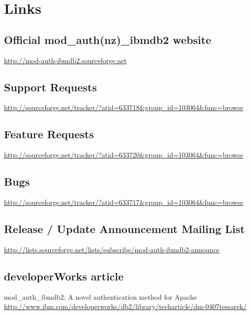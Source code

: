 \documentclass[11pt,a4paper]{article}
\begin{document}
\section{Links}
\subsection{Official mod\_auth(nz)\_ibmdb2 website}
\url{http://mod-auth-ibmdb2.sourceforge.net}
\subsection{Support Requests}
\url{http://sourceforge.net/tracker/?atid=633718&group_id=103064&func=browse}
\subsection{Feature Requests}
\url{http://sourceforge.net/tracker/?atid=633720&group_id=103064&func=browse}
\subsection{Bugs}
\url{http://sourceforge.net/tracker/?atid=633717&group_id=103064&func=browse}
\subsection{Release / Update Announcement Mailing List}
\url{http://lists.sourceforge.net/lists/subscribe/mod-auth-ibmdb2-announce}
\subsection{developerWorks article}
mod\_auth\_ibmdb2: A novel authentication method for Apache\\
\url{http://www.ibm.com/developerworks/db2/library/techarticle/dm-0407tessarek/}
\newpage
\end{document}
